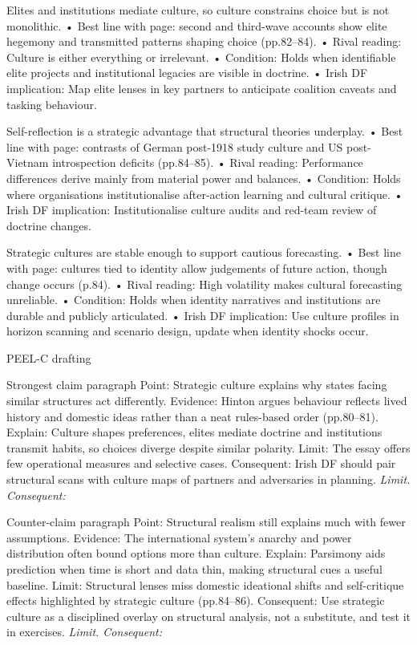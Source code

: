 Elites and institutions mediate culture, so culture constrains choice but is not monolithic.
• Best line with page: second and third-wave accounts show elite hegemony and transmitted patterns shaping choice (pp.82–84).
• Rival reading: Culture is either everything or irrelevant.
• Condition: Holds when identifiable elite projects and institutional legacies are visible in doctrine.
• Irish DF implication: Map elite lenses in key partners to anticipate coalition caveats and tasking behaviour.

Self-reflection is a strategic advantage that structural theories underplay.
• Best line with page: contrasts of German post-1918 study culture and US post-Vietnam introspection deficits (pp.84–85).
• Rival reading: Performance differences derive mainly from material power and balances.
• Condition: Holds where organisations institutionalise after-action learning and cultural critique.
• Irish DF implication: Institutionalise culture audits and red-team review of doctrine changes.

Strategic cultures are stable enough to support cautious forecasting.
• Best line with page: cultures tied to identity allow judgements of future action, though change occurs (p.84).
• Rival reading: High volatility makes cultural forecasting unreliable.
• Condition: Holds when identity narratives and institutions are durable and publicly articulated.
• Irish DF implication: Use culture profiles in horizon scanning and scenario design, update when identity shocks occur.

PEEL-C drafting

Strongest claim paragraph
Point: Strategic culture explains why states facing similar structures act differently.
Evidence: Hinton argues behaviour reflects lived history and domestic ideas rather than a neat rules-based order (pp.80–81).
Explain: Culture shapes preferences, elites mediate doctrine and institutions transmit habits, so choices diverge despite similar polarity.
Limit: The essay offers few operational measures and selective cases.
Consequent: Irish DF should pair structural scans with culture maps of partners and adversaries in planning. \textit{Limit. Consequent:}

Counter-claim paragraph
Point: Structural realism still explains much with fewer assumptions.
Evidence: The international system’s anarchy and power distribution often bound options more than culture.
Explain: Parsimony aids prediction when time is short and data thin, making structural cues a useful baseline.
Limit: Structural lenses miss domestic ideational shifts and self-critique effects highlighted by strategic culture (pp.84–86).
Consequent: Use strategic culture as a disciplined overlay on structural analysis, not a substitute, and test it in exercises. \textit{Limit. Consequent:}

